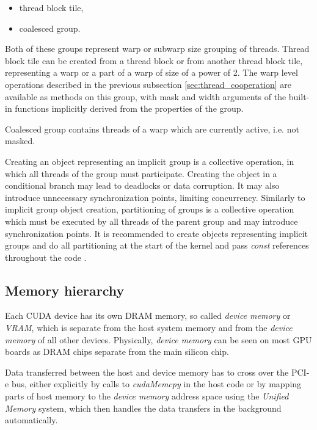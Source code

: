 \begin{itemize}
	\item thread block tile,
	\item coalesced group.
\end{itemize}

Both of these groups represent warp or subwarp size grouping of threads. Thread block tile can be created from a thread block or from another thread block tile, representing a warp or a part of a warp of size of a power of 2. The warp level operations described in the previous subsection \ref{sec:thread_cooperation} are available as methods on this group, with mask and width arguments of the built-in functions implicitly derived from the properties of the group. 

Coalesced group contains threads of a warp which are currently active, i.e. not masked.

Creating an object representing an implicit group is a collective operation, in which all threads of the group must participate. Creating the object in a conditional branch may lead to deadlocks or data corruption. It may also introduce unnecessary synchronization points, limiting concurrency. Similarly to implicit group object creation, partitioning of groups is a collective operation which must be executed by all threads of the parent group and may introduce synchronization points. It is recommended to create objects representing implicit groups and do all partitioning at the start of the kernel and pass \textit{const} references throughout the code \cite{site:cuda}.

\subsection{Memory hierarchy}
\label{sec:memory_hierarchy}

Each CUDA device has its own DRAM memory, so called \textit{device memory} or \textit{VRAM}, which is separate from the host system memory and from the \textit{device memory} of all other devices. Physically, \textit{device memory} can be seen on most GPU boards as DRAM chips separate from the main silicon chip.

Data transferred between the host and device memory has to cross over the PCI-e bus, either explicitly by calls to \textit{cudaMemcpy} in the host code or by mapping parts of host memory to the \textit{device memory} address space using the \textit{Unified Memory} system, which then handles the data transfers in the background automatically.

